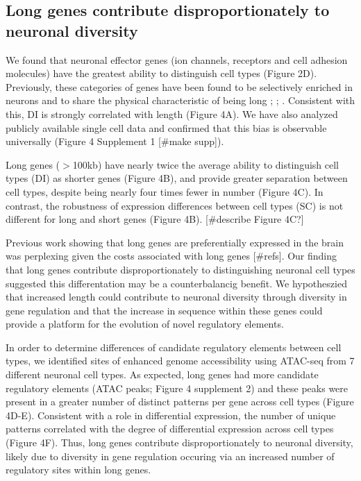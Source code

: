 \subsection{Long genes contribute disproportionately to neuronal diversity}

We found that neuronal effector genes (ion channels, receptors and cell adhesion molecules) have the greatest ability to distinguish cell types (Figure 2D). Previously, these categories of genes have been found to be selectively enriched in neurons and to share the physical characteristic of being long \cite{Sugino_2014}; \cite{Gabel_2015}; \cite{Zylka_2015}. Consistent with this, DI is strongly correlated with length (Figure 4A). We have also analyzed publicly available single cell data and confirmed that this bias is observable universally (Figure 4 Supplement 1 [#make supp]). 

Long genes ($\gt$100kb) have nearly twice the average ability to distinguish cell types (DI) as shorter genes (Figure 4B), and provide greater separation between cell types, despite being nearly four times fewer in number (Figure 4C). In contrast, the robustness of expression differences between cell types (SC) is not different for long and short genes (Figure 4B). [#describe Figure 4C?] 

Previous work showing that long genes are preferentially expressed in the brain was perplexing given the costs associated with long genes [#refs]. Our finding that long genes contribute disproportionately to distinguishing neuronal cell types suggested this differentation may be a counterbalancig benefit. We hypotheszied that increased length could contribute to neuronal diversity through diversity in gene regulation and that the increase in sequence within these genes could provide a platform for the evolution of novel regulatory elements.

In order to determine differences of candidate regulatory elements between cell types, we identified sites of enhanced genome accessibility using ATAC-seq \cite{Buenrostro_2013} from 7 different neuronal cell types. As expected, long genes had more candidate regulatory elements (ATAC peaks; Figure 4 supplement 2) and these peaks were present in a greater number of distinct patterns per gene across cell types (Figure 4D-E). Consistent with a role in differential expression, the number of unique patterns correlated with the degree of differential expression across cell types (Figure 4F). Thus, long genes contribute disproportionately to neuronal diversity, likely due to diversity in gene regulation occuring via an increased number of regulatory sites within long genes. 


